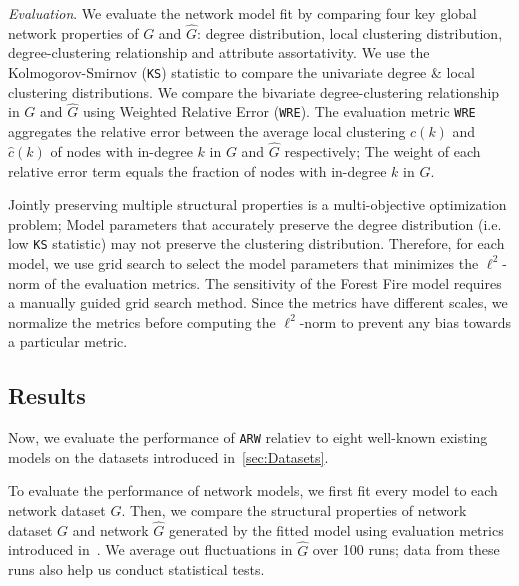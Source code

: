 \textit{Evaluation}.
We evaluate
the network model fit by comparing four key global network properties of ${G}$ and $\hat{G}$:
degree distribution, local clustering distribution, degree-clustering relationship
and attribute assortativity.
We use the Kolmogorov-Smirnov (\texttt{KS}) statistic to compare the univariate degree
\& local clustering distributions.
We compare the bivariate degree-clustering relationship in $G$ and $\hat{G}$ using
Weighted Relative Error (\texttt{WRE}). The evaluation metric \texttt{WRE} aggregates the relative error
between the average local clustering $c(k)$ and $\hat{c}(k)$ of nodes  with in-degree $k$
in $G$ and $\hat{G}$ respectively; The weight of each relative error term equals the fraction
of nodes with in-degree $k$ in $G$.

Jointly preserving multiple structural properties is a multi-objective optimization
problem; Model parameters that accurately preserve the degree distribution
(i.e. low \texttt{KS} statistic) may not preserve the clustering distribution.
Therefore, for each model, we use grid search to select the model parameters
that minimizes the $\ell^2$-norm of the evaluation metrics. The sensitivity of the
Forest Fire model requires a manually guided grid search method. Since the metrics have
different scales, we normalize the metrics before computing the $\ell^2$-norm
to prevent any bias towards a particular metric.

\subsection{Results}
\label{sub:Experimental Results}

Now, we evaluate the performance of \texttt{ARW} relatiev to eight well-known
existing models on the datasets introduced in~\cref{sec:Datasets}.

To evaluate the performance of network models, we first fit every model
to each network dataset $G$. Then, we compare the structural properties of
network dataset $G$ and network $\hat{G}$ generated by the fitted model using
evaluation metrics introduced in~. We average out
fluctuations in $\hat{G}$ over 100 runs; data from these runs also help us conduct statistical tests.

